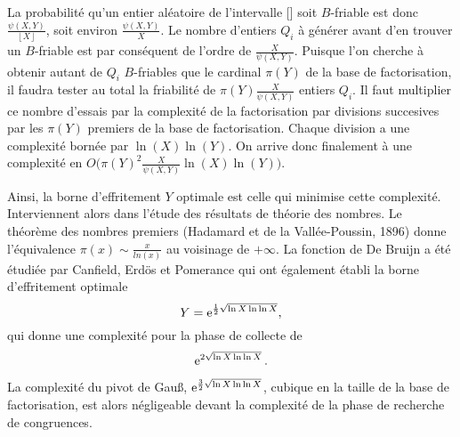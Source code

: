 La probabilité qu'un entier aléatoire de l'intervalle [\![1, X]\!] soit 
$B$-friable est donc $\frac{\psi (X,Y)}{\left\lfloor X \right\rfloor}$, soit
environ $\frac{\psi (X,Y)}{X}$. Le nombre d'entiers $Q_i$ à générer avant d'en 
trouver un $B$-friable est par conséquent de l'ordre de $\frac{X}{\psi(X,Y)}$.
Puisque l'on cherche à obtenir autant de $Q_i$ $B$-friables que le cardinal 
$\pi(Y)$ de la base de factorisation, il faudra tester au total la friabilité
de $\pi(Y)\frac{X}{\psi(X,Y)}$ entiers $Q_i$. Il faut multiplier ce nombre 
d'essais par la complexité de la factorisation par divisions succesives par 
les $\pi(Y)$ premiers de la base de factorisation. Chaque division a une 
complexité bornée par $\ln(X)\ln(Y)$. On arrive donc finalement à une complexité
en $O\big(\pi(Y)^2 \frac{X}{\psi(X,Y)} \ln(X)\ln(Y)\big)$.

Ainsi, la borne d'effritement $Y$ optimale est celle qui minimise cette 
complexité. Interviennent alors dans l'étude des résultats de théorie des 
nombres. Le théorème des nombres premiers (Hadamard et de la
Vallée-Poussin, 1896) donne l'équivalence $\pi(x) \sim \frac{x}{ln(x)}$ au 
voisinage de $+ \infty$. La fonction de De Bruijn a été étudiée par Canfield, 
Erdös et Pomerance qui ont également établi la borne d'effritement optimale  
\[ Y = \operatorname{e}^{\frac{1}{2} \sqrt{\ln X \ln \ln X}},\] qui donne une complexité 
pour la phase de collecte de \[ \operatorname{e}^{2 \sqrt{\ln X \ln \ln X}}.\] 

La complexité du pivot de Gau\ss{}, $\operatorname{e}^{\frac{3}{2} \sqrt{\ln X \ln \ln X}}$,
cubique en la taille de la base de factorisation, est alors négligeable devant 
la complexité de la phase de recherche de congruences.
